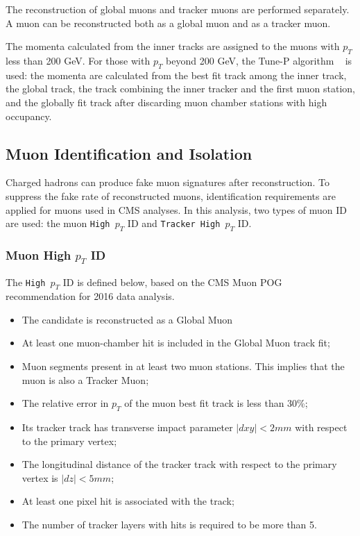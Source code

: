 The reconstruction of global muons and tracker muons are performed separately. A muon can be reconstructed both as a global muon and as a tracker muon.

\vspace{0.3cm}
The momenta calculated from the inner tracks are assigned to the muons with $p_{T}$ less than 200 GeV. For those with $p_T$ beyond 200 GeV, the Tune-P algorithm ~\cite{ob_muonconst2} is used: the momenta are calculated from the best fit track among the inner track, the global track, the track combining the inner tracker and the first muon station, and the globally fit track after discarding muon chamber stations with high occupancy. 

\subsection{Muon Identification and Isolation}\label{sec:ob_midiso}
Charged hadrons can produce fake muon signatures after reconstruction. To suppress the fake rate of reconstructed muons, identification requirements are applied for muons used in CMS analyses. In this analysis, two types of muon ID are used: the muon \texttt{High $p_T$} ID and \texttt{Tracker High $p_T$} ID. 

\subsubsection{Muon High $p_T$ ID}
The \texttt{High $p_T$} ID is defined below, based on the CMS Muon POG recommendation for 2016 data analysis.
\begin{itemize}
\item  The candidate is reconstructed as a Global Muon 
\item  At least one muon-chamber hit is included in the Global Muon track fit;
\item  Muon segments present in at least two muon stations. This implies that the muon is also a Tracker Muon; 
\item  The relative error in $p_T$ of the muon best fit track is less than 30\%;
\item  Its tracker track has transverse impact parameter $|dxy| < 2 mm$ with respect to the primary vertex;
\item  The longitudinal distance of the tracker track with respect to the primary vertex is $|dz| < 5 mm$;
\item  At least one pixel hit is associated with the track;
\item  The number of tracker layers with hits is required to be more than 5.
\end{itemize}

